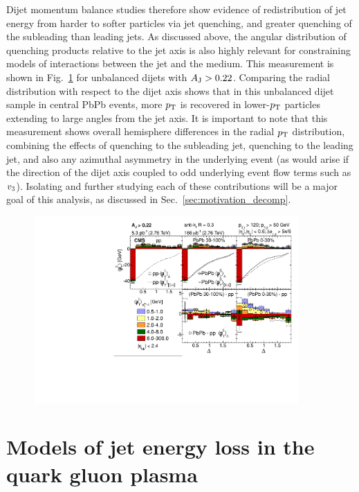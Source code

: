 Dijet momentum balance studies therefore show evidence of redistribution of jet energy from harder to softer particles via jet quenching, and greater quenching of the subleading than leading jets.  As discussed above, the angular distribution of quenching products relative to the jet axis is also highly relevant for constraining models of interactions between the jet and the medium.  This measurement is shown in Fig.~\ref{fig:cms_mpT_unbalanced} for unbalanced dijets with $A_{\rm J} > 0.22$.  Comparing the radial distribution with respect to the dijet axis shows that in this unbalanced dijet sample in central PbPb events, more $p_{\rm T}$ is recovered in lower-$p_{\rm T}$ particles extending to large angles from the jet axis.  It is important to note that this measurement shows overall hemisphere differences in the radial $p_{\rm T}$ distribution, combining the effects of quenching to the subleading jet, quenching to the leading jet, and also any azimuthal asymmetry in the underlying event (as would arise if the direction of the dijet axis coupled to odd underlying event flow terms such as $v_{\rm 3}$).  Isolating and further studying each of these contributions will be a major goal of this analysis, as discussed in Sec.~\ref{sec:motivation_decomp}.


\begin{figure}[hbtp]
\begin{center}
\includegraphics[width=0.9\textwidth]{figures/Theory/MpT_Unbalanced.pdf}
\caption[]{}
\label{fig:cms_mpT_unbalanced}
\end{center}
\end{figure}




\clearpage


\section{Models of jet energy loss in the quark gluon plasma}
\label{sec:theory_models}

